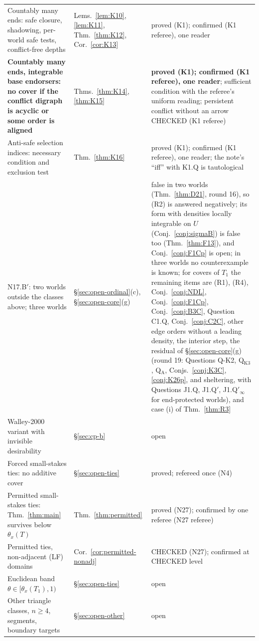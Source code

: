 \documentclass[11pt]{article}
\theoremstyle{definition}
\theoremstyle{remark}
\begin{document}
{\begin{longtable}{>{\raggedright\arraybackslash}p{6.4cm}>{\raggedright\arraybackslash}p{2.1cm}>{\raggedright\arraybackslash}p{5.6cm}}
Countably many ends: safe closure, shadowing, per-world safe tests, conflict-free depths & Lems.~\ref{lem:K10}, \ref{lem:K11}, Thm.~\ref{thm:K12}, Cor.~\ref{cor:K13} & proved (K1); confirmed (K1 referee), one reader\\
\textbf{Countably many ends, integrable base endorsers: no cover if the conflict digraph is acyclic or some order is aligned} & Thms.~\ref{thm:K14}, \ref{thm:K15} & \textbf{proved (K1); confirmed (K1 referee), one reader}; sufficient condition with the referee's uniform reading; persistent conflict without an arrow CHECKED (K1 referee)\\
Anti-safe selection indices: necessary condition and exclusion test & Thm.~\ref{thm:K16} & proved (K1); confirmed (K1 referee), one reader; the note's ``iff'' with K1.Q is tautological\\
N17.B$'$: two worlds outside the classes above; three worlds & \S\ref{sec:open-ordinal}(c), \S\ref{sec:open-core}(g) & false in two worlds (Thm.~\ref{thm:D21}, round 16), so (R2) is answered negatively; its form with densities locally integrable on $U$ (Conj.~\ref{conj:sigmaB}) is false too (Thm.~\ref{thm:F13}), and Conj.~\ref{conj:F1Cp} is open; in three worlds no counterexample is known; for covers of $T_1$ the remaining items are (R1), (R4), Conj.~\ref{conj:NDL}, Conj.~\ref{conj:F1Cp}, Conj.~\ref{conj:B3C}, Question C1.Q, Conj.~\ref{conj:C2C}, other edge orders without a leading density, the interior step, the residual of \S\ref{sec:open-core}(g) (round 19: Questions Q-K2, Q$_{\mathrm{K3}}$, Q$_{\mathrm A}$, Conjs.~\ref{conj:K3C}, \ref{conj:K26p}, and sheltering, with Questions J1.Q, J1.Q$'$, J1.Q$'_\infty$ for end-protected worlds), and case (i) of Thm.~\ref{thm:R3}\\

Walley-2000 variant with invisible desirability & \S\ref{sec:cp-b} & open\\
Forced small-stakes ties: no additive cover & \S\ref{sec:open-ties} & proved; refereed once (N4)\\
Permitted small-stakes ties: Thm.~\ref{thm:main} survives below $\theta_x(T)$ & Thm.~\ref{thm:permitted} & proved (N27); confirmed by one referee (N27 referee)\\
Permitted ties, non-adjacent (LF) domains & Cor.~\ref{cor:permitted-nonadj} & CHECKED (N27); confirmed at CHECKED level\\
Euclidean band $\theta\in[\theta_x(T_1),1)$ & \S\ref{sec:open-ties} & open\\
Other triangle classes, $n\ge4$, segments, boundary targets & \S\ref{sec:open-other} & open\\
\bottomrule
\end{longtable}}
\end{document}
